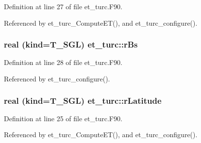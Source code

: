 Definition at line 27 of file et\_\-turc.F90.



Referenced by et\_\-turc\_\-ComputeET(), and et\_\-turc\_\-configure().

\hypertarget{namespaceet__turc_a37fbef983b39e5edf49009f9be114973}{
\subsubsection[{rBs}]{\setlength{\rightskip}{0pt plus 5cm}real (kind=T\_\-SGL) {\bf et\_\-turc::rBs}}}
\label{namespaceet__turc_a37fbef983b39e5edf49009f9be114973}


Definition at line 28 of file et\_\-turc.F90.



Referenced by et\_\-turc\_\-configure().

\hypertarget{namespaceet__turc_a0a0c03917fdebf44a4ab0750bbfac535}{
\subsubsection[{rLatitude}]{\setlength{\rightskip}{0pt plus 5cm}real (kind=T\_\-SGL) {\bf et\_\-turc::rLatitude}}}
\label{namespaceet__turc_a0a0c03917fdebf44a4ab0750bbfac535}


Definition at line 25 of file et\_\-turc.F90.



Referenced by et\_\-turc\_\-ComputeET(), and et\_\-turc\_\-configure().

